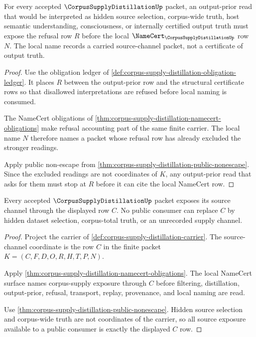 \begin{theorem}
\label{thm:corpus-supply-distillation-output-prior-refusal-exactness}
For every accepted $\CorpusSupplyDistillationUp$ packet, an output-prior read that would be interpreted as hidden source selection, corpus-wide truth, host semantic understanding, consciousness, or internally certified output truth must expose the refusal row $R$ before the local $\NameCert_{\CorpusSupplyDistillationUp}$ row $N$. The local name records a carried source-channel packet, not a certificate of output truth.
\end{theorem}
\begin{proof}
Use the obligation ledger of \autoref{def:corpus-supply-distillation-obligation-ledger}. It places $R$ between the output-prior row and the structural certificate rows so that disallowed interpretations are refused before local naming is consumed.

The NameCert obligations of \autoref{thm:corpus-supply-distillation-namecert-obligations} make refusal accounting part of the same finite carrier. The local name $N$ therefore names a packet whose refusal row has already excluded the stronger readings.

Apply public non-escape from \autoref{thm:corpus-supply-distillation-public-nonescape}. Since the excluded readings are not coordinates of $K$, any output-prior read that asks for them must stop at $R$ before it can cite the local NameCert row.
\end{proof}

\begin{theorem}
\label{thm:corpus-supply-distillation-source-channel-exposure}
Every accepted $\CorpusSupplyDistillationUp$ packet exposes its source channel through the displayed row $C$. No public consumer can replace $C$ by hidden dataset selection, corpus-total truth, or an unrecorded supply channel.
\end{theorem}
\begin{proof}
Project the carrier of \autoref{def:corpus-supply-distillation-carrier}. The source-channel coordinate is the row $C$ in the finite packet $K=(C,F,D,O,R,H,T,P,N)$.

Apply \autoref{thm:corpus-supply-distillation-namecert-obligations}. The local NameCert surface names corpus-supply exposure through $C$ before filtering, distillation, output-prior, refusal, transport, replay, provenance, and local naming are read.

Use \autoref{thm:corpus-supply-distillation-public-nonescape}. Hidden source selection and corpus-wide truth are not coordinates of the carrier, so all source exposure available to a public consumer is exactly the displayed $C$ row.
\end{proof}


